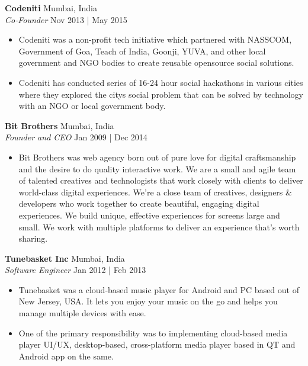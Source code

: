 \documentclass[a4paper]{article}
\begin{document}
\textbf{Codeniti} \hfill Mumbai, India\\
\textit{Co-Founder} \hfill Nov 2013 | May 2015\\
\vspace{-1mm}
\begin{itemize} \itemsep 1pt
	\item Codeniti was a non-profit tech initiative which partnered with NASSCOM, Government of Goa, Teach of India, Goonji, YUVA, and other local government and NGO bodies to create reusable opensource social solutions.
	\item Codeniti has conducted series of 16-24 hour social hackathons in various cities where they explored the city\textquotesingle{}s social problem that can be solved by technology with an NGO or local government body.
\end{itemize}
\textbf{Bit Brothers} \hfill Mumbai, India\\
\textit{Founder and CEO} \hfill Jan 2009 | Dec 2014\\
\vspace{-1mm}
\begin{itemize} \itemsep 1pt
	\item Bit Brothers was web agency born out of pure love for digital craftsmanship and the desire to do quality interactive work. We are a small and agile team of talented creatives and technologists that work closely with clients to deliver world-class digital experiences. We’re a close team of creatives, designers \& developers who work together to create beautiful, engaging digital experiences. We build unique, effective experiences for screens large and small. We work with multiple platforms to deliver an experience that’s worth sharing.
\end{itemize}
\textbf{Tunebasket Inc} \hfill Mumbai, India\\
\textit{Software Engineer} \hfill Jan 2012 | Feb 2013\\
\vspace{-1mm}
\begin{itemize} \itemsep 1pt
	\item Tunebasket was a cloud-based music player for Android and PC based out of New Jersey, USA. It lets you enjoy your music on the go and helps you manage multiple devices with ease.
	\item One of the primary responsibility was to implementing cloud-based media player UI/UX, desktop-based, cross-platform media player based in QT and Android app on the same.
\end{itemize}
\end{document}
